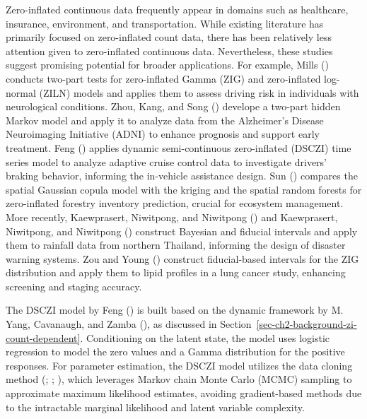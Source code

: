 \documentclass[
  letterpaper,
  double,
  12pt,
  1.0in]{beavtex}
\begin{document}
Zero-inflated continuous data frequently appear in domains such as
healthcare, insurance, environment, and transportation. While existing
literature has primarily focused on zero-inflated count data, there has
been relatively less attention given to zero-inflated continuous data.
Nevertheless, these studies suggest promising potential for broader
applications. For example, Mills ()
conducts two-part tests for zero-inflated Gamma (ZIG) and zero-inflated
log-normal (ZILN) models and applies them to assess driving risk in
individuals with neurological conditions. Zhou, Kang, and Song
() develope a two-part hidden Markov
model and apply it to analyze data from the Alzheimer's Disease
Neuroimaging Initiative (ADNI) to enhance prognosis and support early
treatment. Feng () applies dynamic
semi-continuous zero-inflated (DSCZI) time series model to analyze
adaptive cruise control data to investigate drivers' braking behavior,
informing the in-vehicle assistance design. Sun
() compares the spatial Gaussian
copula model with the kriging and the spatial random forests for
zero-inflated forestry inventory prediction, crucial for ecosystem
management. More recently, Kaewprasert, Niwitpong, and Niwitpong
() and Kaewprasert,
Niwitpong, and Niwitpong ()
construct Bayesian and fiducial intervals and apply them to rainfall
data from northern Thailand, informing the design of disaster warning
systems. Zou and Young () construct
fiducial-based intervals for the ZIG distribution and apply them to
lipid profiles in a lung cancer study, enhancing screening and staging
accuracy.

The DSCZI model by Feng () is built
based on the dynamic framework by M. Yang, Cavanaugh, and Zamba
(), as discussed in
Section~\ref{sec-ch2-background-zi-count-dependent}. Conditioning on the
latent state, the model uses logistic regression to model the zero
values and a Gamma distribution for the positive responses. For
parameter estimation, the DSCZI model utilizes the data cloning method
(;
;
), which
leverages Markov chain Monte Carlo (MCMC) sampling to approximate
maximum likelihood estimates, avoiding gradient-based methods due to the
intractable marginal likelihood and latent variable complexity.
\end{document}
